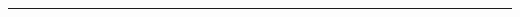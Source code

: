 \documentclass[letterpaper,oneside]{article}
\begin{document}
	
\templatePagecfg

\templateFinalcfg


\inserttitle

\begin{abstract}
	\lipsum[11]
\end{abstract}\vspace{0.1cm}\rule{\textwidth}{1pt}\vspace{0.2cm}

\begin{multicols}{2}
% 
% 


\end{multicols}


\end{document}
